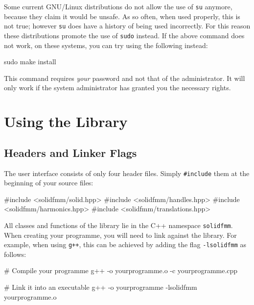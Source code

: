 \documentclass{scrbook}
\begin{document}
Some current GNU/Linux distributions do not allow the use of \lstinline|su|
anymore, because they claim it would be unsafe. As so often, when used properly,
this is not true; however \lstinline|su| does have a history of being used
incorrectly. For this reason these distributions promote the use of
\lstinline|sudo| instead. If the above command does not work, on these systems,
you can try using the following instead:
\begin{commandshell*}
sudo make install
\end{commandshell*}
This command requires \emph{your} password and not that of the administrator. It
will only work if the system administrator has granted you the necessary rights.


\section{Using the Library}

\subsection{Headers and Linker Flags}
The user interface consists of only four header files. Simply
\lstinline|#include| them at the beginning of your source files:
\begin{cppcode*}
#include <solidfmm/solid.hpp>
#include <solidfmm/handles.hpp>
#include <solidfmm/harmonics.hpp>
#include <solidfmm/translations.hpp>
\end{cppcode*}

All classes and functions of the library lie in the C++ namespace
\lstinline|solidfmm|. When creating your programme, you will need to link
against the library. For example, when using \lstinline|g++|, this can be
achieved by adding the flag \lstinline|-lsolidfmm| as follows:
\begin{commandshell*}
# Compile your programme
g++ -o yourprogramme.o -c yourprogramme.cpp

# Link it into an executable
g++ -o yourprogramme -lsolidfmm yourprogramme.o
\end{commandshell*}
\end{document}
